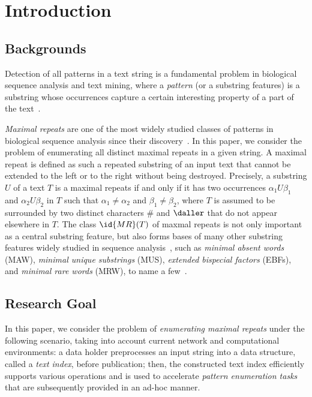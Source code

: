 \newpage
\section{Introduction}

\subsection{Backgrounds}

Detection of all patterns in a text string is a fundamental problem in biological sequence analysis and text mining, where a \textit{pattern} (or a substring features) is a substring whose occurrences capture a certain interesting property of a part of the text~\cite{gusfield1997book:stree}.

\textit{Maximal repeats} are one of the most widely studied classes of patterns in biological sequence analysis since their discovery~\cite{raffinot2001maximal,blumer1987complete}. In this paper, we consider the problem of enumerating all distinct maximal repeats in a given string. 
A maximal repeat is defined as such a repeated substring of an input text that cannot be extended to the left or to the right without being destroyed. Precisely, a substring $U$ of a text $T$ is a maximal repeats if and only if it has two occurrences $\alpha_1 U \beta_1$ and $\alpha_2 U \beta_2$ in $T$ such that $\alpha_1\not= \alpha_2$ and $\beta_1\not= \beta_2$, where $T$ is assumed to be surrounded by two distinct characters $\#$ and $\daller$ that do not appear elsewhere in $T$.
The class $\id{MR}(T)$ of maxmal repeats is not only important as a central substring feature, but also forms bases of many other substring features widely studied in sequence analysis~\cite{inenaga:iwoca2024computing:maw}, such as
\textit{minimal absent words} (MAW), 
\textit{minimal unique substrings} (MUS),
\textit{extended bispecial factors} (EBFs), 
and
\textit{minimal rare words} (MRW),
to name a few~\cite{crochemore1998automata,ilie2011minimum,charalampopoulos2018extended,belazzougui2015space:unusual}. 


\subsection{Research Goal}

In this paper, we consider the problem of \textit{enumerating maximal repeats} under the following scenario, taking into account current network and computational environments: a data holder preprocesses an input string into a data structure, called a \textit{text index}, before publication; then, the constructed text index efficiently supports various operations and is used to accelerate \textit{pattern enumeration tasks} that are subsequently provided in an ad-hoc manner.

